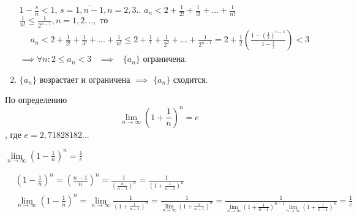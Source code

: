 \documentclass{article}
\begin{document}
\begin{enumerate}
     $1-\frac{s}{n}<1$, $s=\overline{1, n-1}, n=2, 3.. $  $a_n<2+\frac{1}{2!}+\frac{1}{3!}+ ... +\frac{1}{n!}$
    \\
     $\frac{1}{n!}\leq \frac{1}{2^{n-1}}, n=1, 2,.. , \text{ то }$
    \\
    \begin{align*}
        & a_n<2+\frac{1}{2!}+\frac{1}{3!}+...+\frac{1}{n!}\leq 2+\frac{1}{!}+\frac{1}{2^2}+...+\frac{1}{2^{n-1}}=2+\frac{1}{2}\left(\frac{1-\left(\frac{1}{2}\right)^{n-1}}{1-\frac{1}{2}}\right)<3
    \end{align*}
    $\implies \forall n: 2\leq a_n<3$ \ $\implies$ \ $\{a_n\}$ ограничена.
    \item $\{a_n\}$ возрастает и ограничена $\implies$ $\{a_n\}$ сходится.
    
\end{enumerate}

По определению $$\lim\limits_{n\to\infty}{\left(1+\frac{1}{n}\right)^n}=e$$, где $e=2,71828182...$

\theorem

$\lim\limits_{n\to\infty}{\left(1-\frac{1}{n}\right)^n}=\frac{1}{e}$

\proof 

\begin{align*}
    & \left(1-\frac{1}{n}\right)^n=\left(\frac{n-1}{n}\right)^n=\frac{1}{\left(\frac{n}{n-1}\right)^n}=\frac{1}{\left(1+\frac{1}{n-1}\right)^n} 
    \\
    & \lim\limits_{n\to\infty}{\left(1-\frac{1}{n}\right)^n}=\lim\limits_{n\to\infty}{\frac{1}{\left(1+\frac{1}{n-1}\right)^n}}=\frac{1}{\lim\limits_{n\to\infty}{\left(1+\frac{1}{n-1}\right)^n}}=\frac{1}{\lim\limits_{n\to\infty}{\left(1+\frac{1}{n-1}\right)^{n-1}}\lim\limits_{n\to\infty}{\left(1+\frac{1}{n-1}\right)^n}}=\frac{1}{e}
\end{align*}
\end{document}
